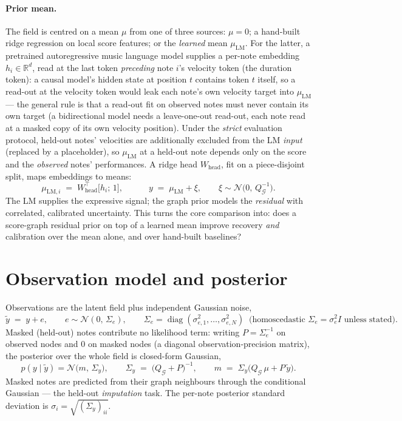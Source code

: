 \documentclass[11pt]{article}
\newcommand{\R}{\mathbb{R}}
\newcommand{\N}{\mathcal{N}}
\newcommand{\graph}{\mathcal{G}}
\newcommand{\Qg}{Q_{\graph}}
\newcommand{\muLM}{\mu_{\mathrm{LM}}}
\newcommand{\diag}{\operatorname{diag}}
\begin{document}
\paragraph{Prior mean.}
The field is centred on a mean $\mu$ from one of three sources: $\mu = 0$; a hand-built
ridge regression on local score features; or the \emph{learned} mean $\muLM$. For the
latter, a pretrained autoregressive music language model supplies a per-note embedding
$h_i \in \R^{d}$, read at the last token \emph{preceding} note $i$'s velocity token (the
duration token): a causal model's hidden state at position $t$ contains token $t$ itself,
so a read-out at the velocity token would leak each note's own velocity target into
$\muLM$ --- the general rule is that a read-out fit on observed notes must never contain
its own target (a bidirectional model needs a leave-one-out read-out, each note read at a
masked copy of its own velocity position). Under the \emph{strict} evaluation protocol,
held-out notes' velocities are additionally excluded from the LM \emph{input} (replaced
by a placeholder), so $\muLM$ at a held-out note depends only on the score and the
\emph{observed} notes' performances. A ridge head $W_{\mathrm{head}}$, fit on a
piece-disjoint split, maps embeddings to means:
\begin{equation}
  \mu_{\mathrm{LM},i} \;=\; W_{\mathrm{head}}^{\top} \bigl[ h_i;\, 1 \bigr],
  \qquad\quad
  y \;=\; \muLM + \xi, \qquad \xi \sim \N\bigl(0,\, \Qg^{-1}\bigr).
  \label{eq:lm-mean}
\end{equation}
The LM supplies the expressive signal; the graph prior models the \emph{residual} with
correlated, calibrated uncertainty. This turns the core comparison into: does a
score-graph residual prior on top of a learned mean improve recovery \emph{and}
calibration over the mean alone, and over hand-built baselines?

\section{Observation model and posterior}
\label{sec:posterior}

Observations are the latent field plus independent Gaussian noise,
\begin{equation}
  \tilde y \;=\; y + e, \qquad e \sim \N(0,\, \Sigma_e),
  \qquad \Sigma_e = \diag(\sigma_{e,1}^2, \dots, \sigma_{e,N}^2)
  \;\;\text{(homoscedastic } \Sigma_e = \sigma_e^2 I \text{ unless stated)}.
  \label{eq:obs}
\end{equation}
Masked (held-out) notes contribute no likelihood term: writing $P = \Sigma_e^{-1}$ on
observed nodes and $0$ on masked nodes (a diagonal observation-precision matrix), the
posterior over the whole field is closed-form Gaussian,
\begin{equation}
  p(y \mid \tilde y) = \N\bigl(m,\, \Sigma_y\bigr), \qquad
  \Sigma_y \;=\; \bigl(\Qg + P\bigr)^{-1}, \qquad
  m \;=\; \Sigma_y \bigl(\Qg\, \mu + P\, \tilde y\bigr).
  \label{eq:posterior}
\end{equation}
Masked notes are predicted from their graph neighbours through the conditional Gaussian
--- the held-out \emph{imputation} task. The per-note posterior standard deviation is
$\sigma_i = \sqrt{(\Sigma_y)_{ii}}$.
\end{document}
